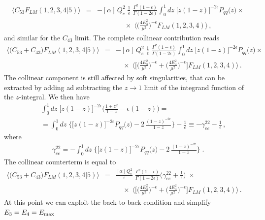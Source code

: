 \documentclass[12pt,a4paper]{article}
\newcommand{\nn}{\nonumber}
\newcommand{\eps}{\epsilon}
\newcommand{\beq}{\begin{eqnarray}}
\newcommand{\eeq}{\end{eqnarray}}
\begin{document}
 \beq
 \big\langle C_{53} F_{LM}(1,2,3,4|5)\big\rangle
&=&- [\alpha]\, Q_e^2 \; 
\frac{1}{\eps} \; 
  \frac{\Gamma^2(1-\eps)}{\Gamma(1-2\eps)}
  \int_0^1 dz \; 
   \big[ z(1-z)\big]^{-2\eps}
   P_{qq} \big(z\big) \times
\nn \\
&& \qquad \qquad \times \; 
\langle
\Big(\frac{4E_{3}^2}{\mu^2} \Big)^{-\eps}
F_{LM}(1,2,3,4) 
\rangle\,  ,
 \eeq
 and similar for the $C_{43}$ limit.
 The complete collinear contribution reads
  \beq
 \big\langle \big(
 C_{53} + C_{43} \big)
 F_{LM}(1,2,3,4|5) \big\rangle
&=&- [\alpha]\, Q_e^2 \; 
\frac{1}{\eps} \; 
  \frac{\Gamma^2(1-\eps)}{\Gamma(1-2\eps)}
  \int_0^1 dz \; 
   \big[ z(1-z)\big]^{-2\eps}
   P_{qq} \big(z\big) \times
\nn \\
&& \quad  \times \; 
\Big\langle
\bigg[
\Big(\frac{4E_{3}^2}{\mu^2} \Big)^{-\eps}
+
\Big(\frac{4E_{4}^2}{\mu^2} \Big)^{-\eps}
\bigg]
F_{LM}(1,2,3,4) 
\Big\rangle\,  .
\qquad 
 \eeq
 The collinear component is still affected by soft singularities, that can be extracted by adding ad subtracting the $z \rightarrow 1$ limit of the integrand function of the $z$-integral. We then have
 \beq
&&
\int_0^1 dz \; 
   \big[ z(1-z)\big]^{-2\eps}
   \bigg( \frac{1+z^2}{1-z}-\eps(1-z)\bigg)
   =
   \nn \\
&&   =
\int_0^1 dz \; 
\bigg\{
   \big[ z(1-z)\big]^{-2\eps}
   P_{qq} \big(z\big) 
   -
 2 \,  \frac{ (1-z)^{-2\eps}}{1-z}
   \bigg\}
   -
   \frac{1}{\eps}
   \equiv
   -\gamma_{ee}^{22}
      - \frac{1}{\eps} \, ,
      \eeq
where
\beq
\gamma_{ee}^{22} =
- \int_0^1 dz \; 
\bigg\{
   \big[ z(1-z)\big]^{-2\eps}
   P_{qq} \big(z\big) 
   -
 2 \,  \frac{ (1-z)^{-2\eps}}{1-z}
   \bigg\} \; .
   \label{eq:gamma_ee_22}
\eeq
The collinear counterterm is equal to
  \beq
 \big\langle \big(
 C_{53} + C_{43} \big)
 F_{LM}(1,2,3,4|5) \big\rangle
&=&
\frac{[\alpha]\, Q_e^2}{\eps} \; 
  \frac{\Gamma^2(1-\eps)}{\Gamma(1-2\eps)}
\Big(  \gamma_{ee}^{22}
     + \frac{1}{\eps}  \Big) \; \times
\nn \\
&& \quad  \times \; 
\Big\langle
\bigg[
\Big(\frac{4E_{3}^2}{\mu^2} \Big)^{-\eps}
+
\Big(\frac{4E_{4}^2}{\mu^2} \Big)^{-\eps}
\bigg]
F_{LM}(1,2,3,4) 
\Big\rangle\,  .
\qquad 
 \eeq
At this point we can exploit the back-to-back condition and simplify $E_3=E_4=E_{\rm max}$
\end{document}
